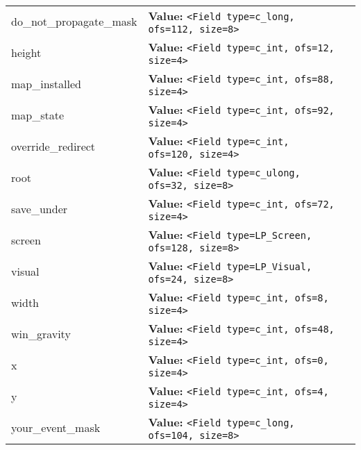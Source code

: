 \begin{longtable}{|p{\varnamewidth}|p{\vardescrwidth}|l}
\cline{1-2}
\raggedright d\-o\-\_\-n\-o\-t\-\_\-p\-r\-o\-p\-a\-g\-a\-t\-e\-\_\-m\-a\-s\-k\- & \raggedright \textbf{Value:} 
{\tt {\textless}Field type=c\_long, ofs=112, size=8{\textgreater}}&\\
\cline{1-2}
\raggedright h\-e\-i\-g\-h\-t\- & \raggedright \textbf{Value:} 
{\tt {\textless}Field type=c\_int, ofs=12, size=4{\textgreater}}&\\
\cline{1-2}
\raggedright m\-a\-p\-\_\-i\-n\-s\-t\-a\-l\-l\-e\-d\- & \raggedright \textbf{Value:} 
{\tt {\textless}Field type=c\_int, ofs=88, size=4{\textgreater}}&\\
\cline{1-2}
\raggedright m\-a\-p\-\_\-s\-t\-a\-t\-e\- & \raggedright \textbf{Value:} 
{\tt {\textless}Field type=c\_int, ofs=92, size=4{\textgreater}}&\\
\cline{1-2}
\raggedright o\-v\-e\-r\-r\-i\-d\-e\-\_\-r\-e\-d\-i\-r\-e\-c\-t\- & \raggedright \textbf{Value:} 
{\tt {\textless}Field type=c\_int, ofs=120, size=4{\textgreater}}&\\
\cline{1-2}
\raggedright r\-o\-o\-t\- & \raggedright \textbf{Value:} 
{\tt {\textless}Field type=c\_ulong, ofs=32, size=8{\textgreater}}&\\
\cline{1-2}
\raggedright s\-a\-v\-e\-\_\-u\-n\-d\-e\-r\- & \raggedright \textbf{Value:} 
{\tt {\textless}Field type=c\_int, ofs=72, size=4{\textgreater}}&\\
\cline{1-2}
\raggedright s\-c\-r\-e\-e\-n\- & \raggedright \textbf{Value:} 
{\tt {\textless}Field type=LP\_Screen, ofs=128, size=8{\textgreater}}&\\
\cline{1-2}
\raggedright v\-i\-s\-u\-a\-l\- & \raggedright \textbf{Value:} 
{\tt {\textless}Field type=LP\_Visual, ofs=24, size=8{\textgreater}}&\\
\cline{1-2}
\raggedright w\-i\-d\-t\-h\- & \raggedright \textbf{Value:} 
{\tt {\textless}Field type=c\_int, ofs=8, size=4{\textgreater}}&\\
\cline{1-2}
\raggedright w\-i\-n\-\_\-g\-r\-a\-v\-i\-t\-y\- & \raggedright \textbf{Value:} 
{\tt {\textless}Field type=c\_int, ofs=48, size=4{\textgreater}}&\\
\cline{1-2}
\raggedright x\- & \raggedright \textbf{Value:} 
{\tt {\textless}Field type=c\_int, ofs=0, size=4{\textgreater}}&\\
\cline{1-2}
\raggedright y\- & \raggedright \textbf{Value:} 
{\tt {\textless}Field type=c\_int, ofs=4, size=4{\textgreater}}&\\
\cline{1-2}
\raggedright y\-o\-u\-r\-\_\-e\-v\-e\-n\-t\-\_\-m\-a\-s\-k\- & \raggedright \textbf{Value:} 
{\tt {\textless}Field type=c\_long, ofs=104, size=8{\textgreater}}&\\
\cline{1-2}
\end{longtable}


